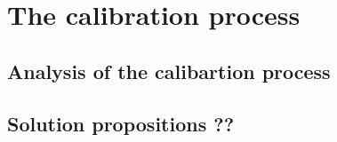 \chapter{The calibration process}\label{chap:Calibration}
\section{Analysis of the calibartion process}

\section{Solution propositions ??}


